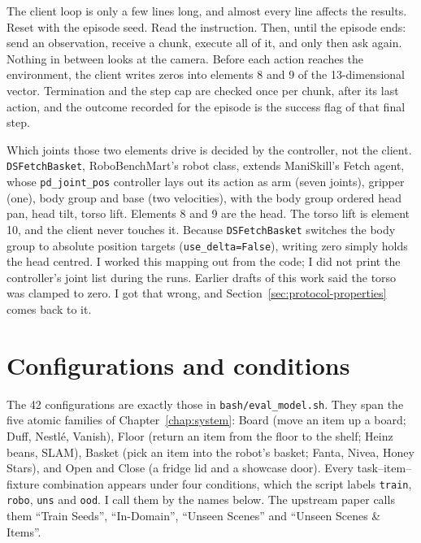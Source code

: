 The client loop is only a few lines long, and almost every line affects the results. Reset with the episode seed. Read the instruction. Then, until the episode ends: send an observation, receive a chunk, execute all of it, and only then ask again. Nothing in between looks at the camera. Before each action reaches the environment, the client writes zeros into elements 8 and 9 of the 13-dimensional vector. Termination and the step cap are checked once per chunk, after its last action, and the outcome recorded for the episode is the success flag of that final step.

Which joints those two elements drive is decided by the controller, not the client. \texttt{DSFetchBasket}, RoboBenchMart's robot class, extends ManiSkill's Fetch agent, whose \texttt{pd\_joint\_pos} controller lays out its action as arm (seven joints), gripper (one), body group and base (two velocities), with the body group ordered head pan, head tilt, torso lift. Elements 8 and 9 are the head. The torso lift is element 10, and the client never touches it. Because \texttt{DSFetchBasket} switches the body group to absolute position targets (\texttt{use\_delta=False}), writing zero simply holds the head centred. I worked this mapping out from the code; I did not print the controller's joint list during the runs. Earlier drafts of this work said the torso was clamped to zero. I got that wrong, and Section~\ref{sec:protocol-properties} comes back to it.

\section{Configurations and conditions}
\label{sec:conditions-def}

The 42 configurations are exactly those in \texttt{bash/eval\_model.sh}. They span the five atomic families of Chapter~\ref{chap:system}: Board (move an item up a board; Duff, Nestl\'e, Vanish), Floor (return an item from the floor to the shelf; Heinz beans, SLAM), Basket (pick an item into the robot's basket; Fanta, Nivea, Honey Stars), and Open and Close (a fridge lid and a showcase door). Every task--item--fixture combination appears under four conditions, which the script labels \texttt{train}, \texttt{robo}, \texttt{uns} and \texttt{ood}. I call them by the names below. The upstream paper calls them ``Train Seeds'', ``In-Domain'', ``Unseen Scenes'' and ``Unseen Scenes \& Items''.

